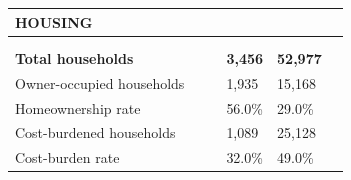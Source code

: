 \documentclass[9pt]{report}
\begin{document}
\vspace{12pt}
\setlength{\tabcolsep}{.01in} %
\begin{tabular}{p{.10in}p{.10in}p{.10in}p{3.7in}>{\hfill}p{.85in}>{\hfill}p{.85in}>{\hfill}p{.85in}>{\hfill}p{.85in}p{0.1in}}
\multicolumn{9}{l}{\parbox{7.1in}{\raggedright{\large{\strut\textbf{HOUSING}\strut}}}} \\ 
\hline
\multicolumn{4}{l}{\parbox{3.5in}{\raggedright{\textbf{}}}} & \multicolumn{1}{r}{\parbox{.85in}{\strut\raggedleft{\textbf{}\strut}}} & \multicolumn{1}{r}{\parbox{.85in}{\strut\raggedleft{\textbf{}\strut}}} & \multicolumn{1}{r}{\parbox{.85in}{\strut{}}} & \multicolumn{1}{r}{\parbox{.85in}{\strut{}}} & \\ 
\multicolumn{9}{l}{} \\ 
\multicolumn{4}{l}{\parbox{3.5in}{\strut\raggedright{\textbf{Total households}\strut}}} & \textbf{} & \textbf{} & \textbf{3,456} & \textbf{52,977} & \textbf{} \\ 
\multicolumn{4}{l}{\parbox{3.6in}{\strut\raggedright{{Owner-occupied households}}\strut}} &  &  & 1,935 & 15,168 & \multicolumn{1}{l}{}  \\ 
\multicolumn{4}{l}{\parbox{3.6in}{\strut\raggedright{{Homeownership rate}}\strut}} &  &  & 56.0\% & 29.0\% & \multicolumn{1}{l}{}  \\ 
\multicolumn{4}{l}{\parbox{3.6in}{\strut\raggedright{{Cost-burdened households}}\strut}} &  &  & 1,089 & 25,128 & \multicolumn{1}{l}{}  \\ 
\multicolumn{4}{l}{\parbox{3.6in}{\strut\raggedright{{Cost-burden rate}}\strut}} &  &  & 32.0\% & 49.0\% & \multicolumn{1}{l}{}  \\ 

\end{tabular}
\setlength{\tabcolsep}{6pt} %
\end{document}
